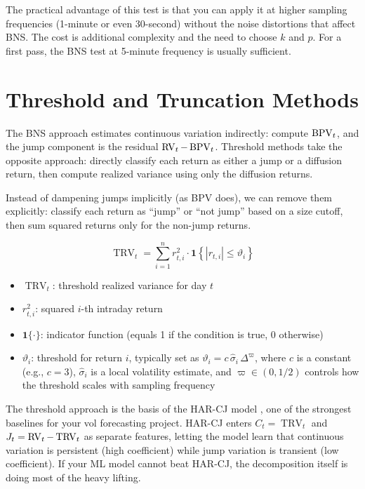 The practical advantage of this test is that you can apply it at higher sampling frequencies (1-minute or even 30-second) without the noise distortions that affect BNS.
The cost is additional complexity and the need to choose $k$ and $p$.
For a first pass, the BNS test at 5-minute frequency is usually sufficient.


\section{Threshold and Truncation Methods}
\label{sec:threshold}

The BNS approach estimates continuous variation indirectly: compute $\operatorname{BPV}_t$, and the jump component is the residual $\operatorname{RV}_t - \operatorname{BPV}_t$.
Threshold methods take the opposite approach: directly classify each return as either a jump or a diffusion return, then compute realized variance using only the diffusion returns.

\begin{definition}
Instead of dampening jumps implicitly (as BPV does), we can remove them explicitly: classify each return as ``jump'' or ``not jump'' based on a size cutoff, then sum squared returns only for the non-jump returns.

\begin{equation}
  \operatorname{TRV}_t = \sum_{i=1}^{n} r_{t,i}^2 \cdot \mathbf{1}\!\left\{|r_{t,i}| \leq \vartheta_i\right\}
  \label{eq:trv}
\end{equation}
\begin{itemize}[nosep]
  \item $\operatorname{TRV}_t$: threshold realized variance for day $t$
  \item $r_{t,i}^2$: squared $i$-th intraday return
  \item $\mathbf{1}\{\cdot\}$: indicator function (equals 1 if the condition is true, 0 otherwise)
  \item $\vartheta_i$: threshold for return $i$, typically set as $\vartheta_i = c\,\hat{\sigma}_i\,\Delta^{\varpi}$, where $c$ is a constant (e.g., $c = 3$), $\hat{\sigma}_i$ is a local volatility estimate, and $\varpi \in (0, 1/2)$ controls how the threshold scales with sampling frequency
\end{itemize}
\end{definition}

\begin{projectconnection}
The threshold approach is the basis of the HAR-CJ model \citep{CorsiPirinoReno2010}, one of the strongest baselines for your vol forecasting project.
HAR-CJ enters $C_t = \operatorname{TRV}_t$ and $J_t = \operatorname{RV}_t - \operatorname{TRV}_t$ as separate features, letting the model learn that continuous variation is persistent (high coefficient) while jump variation is transient (low coefficient).
If your ML model cannot beat HAR-CJ, the decomposition itself is doing most of the heavy lifting.
\end{projectconnection}

